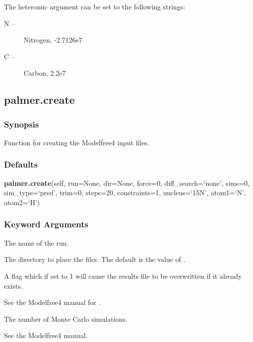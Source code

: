 The heteronuc argument can be set to the following strings:


\begin{description}
\item[N --]  Nitrogen, -2.7126e7 
\item[C --]  Carbon, 2.2e7 
\end{description}




\newpage

\subsection{palmer.create}


\subsubsection{Synopsis}

Function for creating the Modelfree4 input files.



\subsubsection{Defaults}

\textsf{\textbf{palmer.create}(self, run=None, dir=None, force=0, diff\_search=`none', sims=0, sim\_type=`pred', trim=0, steps=20, constraints=1, nucleus=`15N', atom1=`N', atom2=`H')}


\subsubsection{Keyword Arguments}

  The name of the run. 

  The directory to place the files.  The default is the value of . 

  A flag which if set to 1 will cause the results file to be overwritten if it already exists. 

  See the Modelfree4 manual for . 

  The number of Monte Carlo simulations. 

  See the Modelfree4 manual. 

